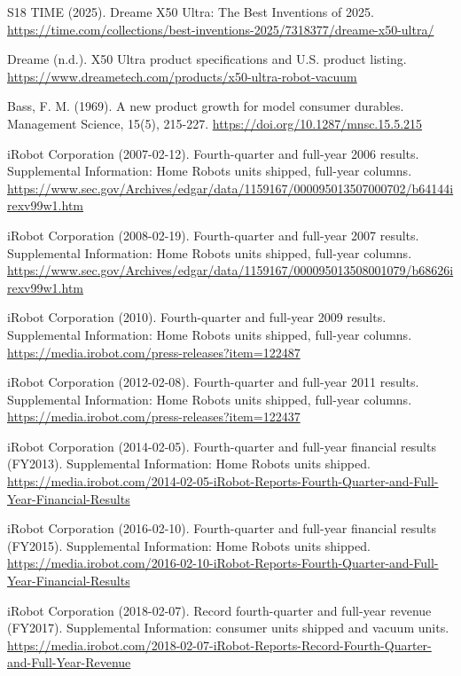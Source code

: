 \documentclass[11pt,a4paper]{article}
\begin{document}
\clearpage
\begin{thebibliography}{S18}
 TIME (2025). Dreame X50 Ultra: The Best Inventions of 2025.
\url{https://time.com/collections/best-inventions-2025/7318377/dreame-x50-ultra/}

 Dreame (n.d.). X50 Ultra product specifications and U.S. product listing.
\url{https://www.dreametech.com/products/x50-ultra-robot-vacuum}

 Bass, F. M. (1969). A new product growth for model consumer durables. Management Science, 15(5), 215-227.
\url{https://doi.org/10.1287/mnsc.15.5.215}

 iRobot Corporation (2007-02-12). Fourth-quarter and full-year 2006 results. Supplemental Information: Home Robots units shipped, full-year columns.
\url{https://www.sec.gov/Archives/edgar/data/1159167/000095013507000702/b64144irexv99w1.htm}

 iRobot Corporation (2008-02-19). Fourth-quarter and full-year 2007 results. Supplemental Information: Home Robots units shipped, full-year columns.
\url{https://www.sec.gov/Archives/edgar/data/1159167/000095013508001079/b68626irexv99w1.htm}

 iRobot Corporation (2010). Fourth-quarter and full-year 2009 results. Supplemental Information: Home Robots units shipped, full-year columns.
\url{https://media.irobot.com/press-releases?item=122487}

 iRobot Corporation (2012-02-08). Fourth-quarter and full-year 2011 results. Supplemental Information: Home Robots units shipped, full-year columns.
\url{https://media.irobot.com/press-releases?item=122437}

 iRobot Corporation (2014-02-05). Fourth-quarter and full-year financial results (FY2013). Supplemental Information: Home Robots units shipped.
\url{https://media.irobot.com/2014-02-05-iRobot-Reports-Fourth-Quarter-and-Full-Year-Financial-Results}

 iRobot Corporation (2016-02-10). Fourth-quarter and full-year financial results (FY2015). Supplemental Information: Home Robots units shipped.
\url{https://media.irobot.com/2016-02-10-iRobot-Reports-Fourth-Quarter-and-Full-Year-Financial-Results}

 iRobot Corporation (2018-02-07). Record fourth-quarter and full-year revenue (FY2017). Supplemental Information: consumer units shipped and vacuum units.
\url{https://media.irobot.com/2018-02-07-iRobot-Reports-Record-Fourth-Quarter-and-Full-Year-Revenue}


\end{thebibliography}
\end{document}
